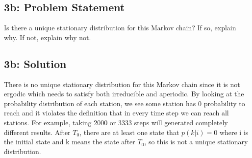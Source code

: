 \documentclass[10pt]{article}
\newcommand{\officialdirections}[1]{{\color{purple} #1}}
\begin{document}
\officialdirections{
\subsection*{3b: Problem Statement}
Is there a unique stationary distribution for this Markov chain? If so, explain why. If not, explain why not.
}


\subsection{3b: Solution}
There is no unique stationary distribution for this Markov chain since it is not ergodic which needs to satisfy both irreducible and aperiodic. By looking at the probability distribution of each station, we see some station has 0 probability to reach and it violates the definition that in every time step we can reach all stations. For example, taking 2000 or 3333 steps will generated completely different results. After $T_0$, there are at least one state that $p(k|i) = 0$ where i is the initial state and k means the state after $T_0$, so this is not a unique stationary distribution.
\end{document}
